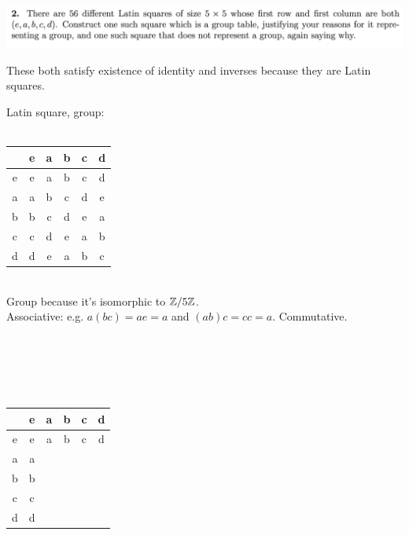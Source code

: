 \documentclass[12pt]{article}
\begin{document}
\begin{mdframed}
\includegraphics[width=400pt]{img/oxford-prelims-M1-groups-1-2.png}
\end{mdframed}
These both satisfy existence of identity and inverses because they are Latin squares.

Latin square, group:\\~\\
\begin{tabular}{c||c|c|c|c|c|}
    & e & a & b & c & d\\
  \hline
  \hline
  e & e & a & b & c & d\\
  a & a & b & c & d & e\\
  b & b & c & d & e & a\\
  c & c & d & e & a & b\\
  d & d & e & a & b & c
\end{tabular}\\
Group because it's isomorphic to $\mathbb{Z}/5\mathbb{Z}$.\\
Associative: e.g. $a(bc) = ae = a$ and $(ab)c = cc = a$.
Commutative.

~\\~\\
\\~\\
\begin{tabular}{c||c|c|c|c|c|}
    & e & a & b & c & d\\
  \hline
  \hline
  e & e & a & b & c & d\\
  a & a &&&&\\
  b & b &&&&\\
  c & c &&&&\\
  d & d &&&&
\end{tabular}
\end{document}
